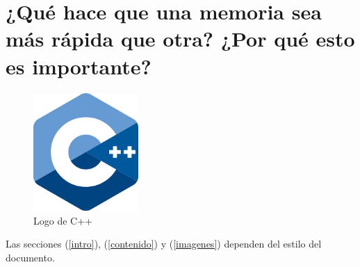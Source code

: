 \documentclass{article}
\begin{document}
\section{¿Qué hace que una memoria sea más rápida que otra? ¿Por qué esto es importante?} 


\begin{figure}[h]
\includegraphics[width=4cm]{cpplogo.png}
\centering
\caption{Logo de C++}
\label{fig:cpplogo}
\end{figure}

Las secciones (\ref{intro}), (\ref{contenido}) y (\ref{imagenes}) dependen del estilo del documento.



\end{document}
